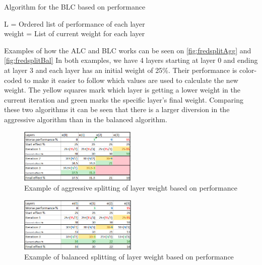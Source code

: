 \begin{algorithm}
    \caption{Algorithm for the BLC based on performance}
    \SetAlgoLined
    L = Ordered list of performance of each layer \\
    weight  = List of current weight for each layer \\
    \label{alg:bal-layereffect}
\end{algorithm}
Examples of how the ALC and BLC works can be seen on \autoref{fig:fredsplitAgg} and \autoref{fig:fredsplitBal}
In both examples, we have 4 layers starting at layer 0 and ending at layer 3 and each layer has an initial weight of 25\%.
Their performance is color-coded to make it easier to follow which values are used to calculate the new weight.
The yellow squares mark which layer is getting a lower weight in the current iteration and green marks the specific layer's final weight.
Comparing these two algorithms it can be seen that there is a larger diversion in the aggressive algorithm than in the balanced algorithm.

\begin{figure}
    \includegraphics[width=0.5\textwidth]{figures/fredsplit/aggresiveAlgo.png}
    \centering
    \caption{Example of aggressive splitting of layer weight based on performance}
    \label{fig:fredsplitAgg}
\end{figure}

\begin{figure}
    \includegraphics[width=0.5\textwidth]{figures/fredsplit/balancedAlgo.png}
    \centering
    \caption{Example of balanced splitting of layer weight based on performance}
    \label{fig:fredsplitBal}
\end{figure}

